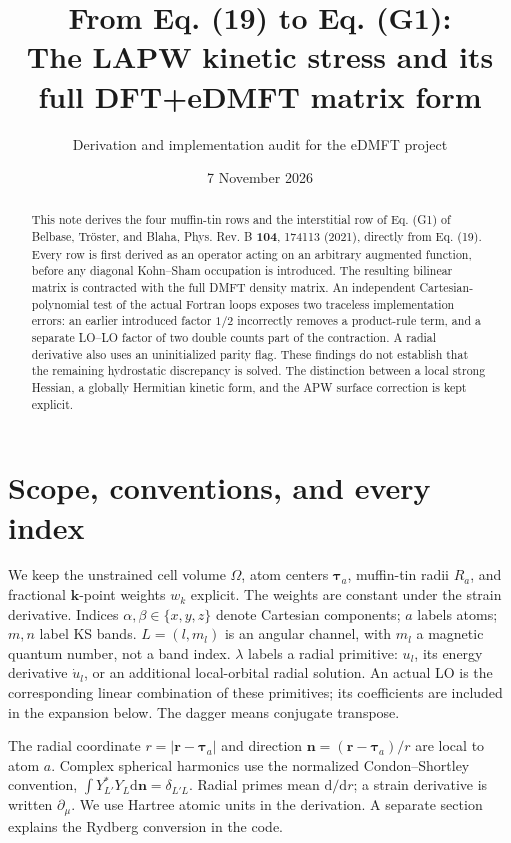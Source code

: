 \documentclass[11pt]{article}
\title{From Eq. (19) to Eq. (G1):\\The LAPW kinetic stress and its full DFT+eDMFT matrix form}
\author{Derivation and implementation audit for the eDMFT project}
\date{7 November 2026}
\newcommand{\dd}{\mathrm d}
\begin{document}
\maketitle
\begin{abstract}
This note derives the four muffin-tin rows and the interstitial row of Eq. (G1) of Belbase, Tr\"oster, and Blaha, Phys. Rev. B \textbf{104}, 174113 (2021), directly from Eq. (19). Every row is first derived as an operator acting on an arbitrary augmented function, before any diagonal Kohn--Sham occupation is introduced. The resulting bilinear matrix is contracted with the full DMFT density matrix. An independent Cartesian-polynomial test of the actual Fortran loops exposes two traceless implementation errors: an earlier introduced factor $1/2$ incorrectly removes a product-rule term, and a separate LO--LO factor of two double counts part of the contraction. A radial derivative also uses an uninitialized parity flag. These findings do not establish that the remaining hydrostatic discrepancy is solved. The distinction between a local strong Hessian, a globally Hermitian kinetic form, and the APW surface correction is kept explicit.
\end{abstract}
\setcounter{tocdepth}{1}
{\small\tableofcontents}
\newpage

\section{Scope, conventions, and every index}
We keep the unstrained cell volume $\Omega$, atom centers $\bm\tau_a$, muffin-tin radii $R_a$, and fractional $\bm k$-point weights $w_k$ explicit. The weights are constant under the strain derivative. Indices $\alpha,\beta\in\{x,y,z\}$ denote Cartesian components; $a$ labels atoms; $m,n$ label KS bands. $L=(l,m_l)$ is an angular channel, with $m_l$ a magnetic quantum number, not a band index. $\lambda$ labels a radial primitive: $u_l$, its energy derivative $\dot u_l$, or an additional local-orbital radial solution. An actual LO is the corresponding linear combination of these primitives; its coefficients are included in the expansion below. The dagger means conjugate transpose.

The radial coordinate $r=|\bm r-\bm\tau_a|$ and direction $\bm n=(\bm r-\bm\tau_a)/r$ are local to atom $a$. Complex spherical harmonics use the normalized Condon--Shortley convention, $\int Y_{L'}^*Y_L\dd\bm n=\delta_{L'L}$. Radial primes mean $\dd/\dd r$; a strain derivative is written $\partial_\mu$. We use Hartree atomic units in the derivation. A separate section explains the Rydberg conversion in the code.
\end{document}
